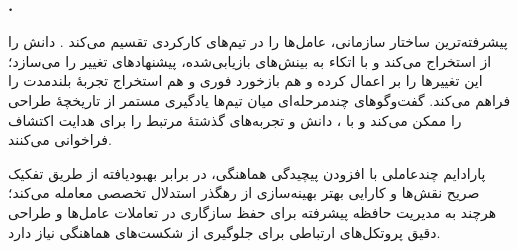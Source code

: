 \subsubsection{\protect{}.}
پیشرفته‌ترین ساختار سازمانی، عامل‌ها را در تیم‌های کارکردی تقسیم می‌کند \cite{Yang2025NADER}.  دانش را از  استخراج می‌کند و با اتکاء به بینش‌های بازیابی‌شده، پیشنهادهای تغییر را می‌سازد؛  این تغییرها را بر  اعمال کرده و هم بازخورد فوری و هم استخراج تجربهٔ بلندمدت را فراهم می‌کند. گفت‌وگوهای چندمرحله‌ای میان تیم‌ها یادگیری مستمر از تاریخچهٔ طراحی را ممکن می‌کند و  با ، دانش و تجربه‌های گذشتهٔ مرتبط را برای هدایت اکتشاف فراخوانی می‌کنند.

پارادایم چندعاملی با افزودن پیچیدگی هماهنگی، در برابر  بهبود‌یافته از طریق تفکیک صریح نقش‌ها و کارایی بهتر بهینه‌سازی از رهگذر استدلال تخصصی معامله می‌کند؛ هرچند به مدیریت حافظه پیشرفته برای حفظ سازگاری در تعاملات عامل‌ها و طراحی دقیق پروتکل‌های ارتباطی برای جلوگیری از شکست‌های هماهنگی نیاز دارد.
